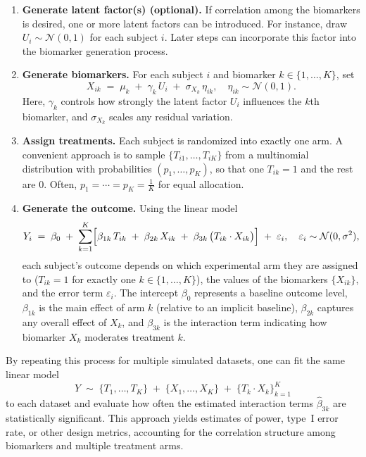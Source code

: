\documentclass[11pt]{article}
\begin{document}
\begin{enumerate}
\item \textbf{Generate latent factor(s) (optional).} 
  If correlation among the biomarkers is desired, one or more latent factors can be introduced. 
  For instance, draw \(U_i \sim \mathcal{N}(0,1)\) for each subject \(i\). 
  Later steps can incorporate this factor into the biomarker generation process.

\item \textbf{Generate biomarkers.} 
  For each subject \(i\) and biomarker \(k \in \{1,\dots,K\}\), set
  \[
    X_{ik} \;=\; \mu_k \;+\; \gamma_k\,U_i \;+\; \sigma_{X_k}\,\eta_{ik}, 
    \quad \eta_{ik} \sim \mathcal{N}(0,1).
  \]
  Here, \(\gamma_k\) controls how strongly the latent factor \(U_i\) influences the \(k\)th biomarker, and \(\sigma_{X_k}\) scales any residual variation.

\item \textbf{Assign treatments.}
  Each subject is randomized into exactly one arm. 
  A convenient approach is to sample \(\{T_{i1},\dots,T_{iK}\}\) from a multinomial distribution with probabilities \((p_1,\dots,p_K)\), 
  so that one \(T_{ik}=1\) and the rest are 0. 
  Often, \(p_1 = \cdots = p_K = \frac{1}{K}\) for equal allocation.

\item \textbf{Generate the outcome.}
  Using the linear model
  \[
    Y_i \;=\; 
      \beta_0 
      \;+\; \sum_{k=1}^K \Bigl[
          \beta_{1k}\,T_{ik}
        \;+\;\beta_{2k}\,X_{ik}
        \;+\;\beta_{3k}\,\bigl(T_{ik} \cdot X_{ik}\bigr)
      \Bigr]
      \;+\;\varepsilon_i, 
    \quad \varepsilon_i \sim \mathcal{N}(0,\sigma^2),
  \]
  each subject's outcome depends on which experimental arm they are assigned to (\(T_{ik}=1\) for exactly one \(k \in \{1,\dots,K\}\)), 
  the values of the biomarkers \(\{X_{ik}\}\), 
  and the error term \(\varepsilon_i\). 
  The intercept \(\beta_0\) represents a baseline outcome level, 
  \(\beta_{1k}\) is the main effect of arm \(k\) (relative to an implicit baseline), 
  \(\beta_{2k}\) captures any overall effect of \(X_k\), 
  and \(\beta_{3k}\) is the interaction term indicating how biomarker \(X_k\) moderates treatment \(k\).

\end{enumerate}

By repeating this process for multiple simulated datasets, one can fit the same linear model 
\[
   Y \;\sim\; \{T_{1},\dots,T_{K}\} \;+\; \{X_{1},\dots,X_{K}\} \;+\; \{T_{k} \cdot X_{k}\}_{k=1}^K
\]
to each dataset and evaluate how often the estimated interaction terms \(\hat{\beta}_{3k}\) are statistically significant. 
This approach yields estimates of power, type~I error rate, or other design metrics, 
accounting for the correlation structure among biomarkers and multiple treatment arms.
\end{document}
